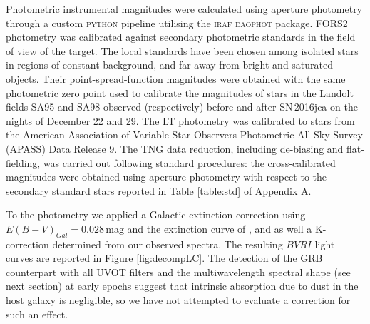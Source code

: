 \documentclass[fleqn,usenatbib]{mnras}
\begin{document}
Photometric instrumental magnitudes were calculated using aperture photometry through a custom \textsc{python} pipeline utilising the \textsc{iraf} \textsc{daophot} package. FORS2 photometry was calibrated against secondary photometric standards  in the field of view of the target.  The local standards have been chosen among isolated stars in regions of constant background, and far away from bright and saturated objects. Their point-spread-function magnitudes were obtained with the same photometric zero point used to calibrate the magnitudes of stars in the Landolt 
fields SA95 and SA98 observed (respectively) before and after  SN\,2016jca on the nights of December 22 and 29. 
The LT photometry was calibrated to stars from the American Association of Variable Star Observers Photometric All-Sky Survey (APASS) Data Release 9. The TNG data reduction, including de-biasing and flat-fielding, was carried out following standard procedures: the cross-calibrated magnitudes were obtained using aperture photometry with respect to the secondary standard stars reported in Table \ref{table:std} of Appendix A.

To the photometry  we applied a Galactic extinction correction using $E(B-V)_{Gal} = 0.028$\,mag \citep{Schlafly11} and the extinction curve of \citet{Cardelli89},  and as well a K-correction determined from our observed spectra. The resulting  $BVRI$ light curves are reported in Figure \ref{fig:decompLC}.  The detection of the GRB counterpart with all UVOT filters  and the multiwavelength spectral shape (see next section) at early epochs suggest that  intrinsic absorption due to dust in the host  galaxy is negligible, so we have not attempted to evaluate  a correction for such an effect. 
 

\end{document}
